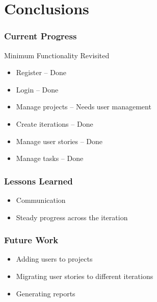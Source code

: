 \documentclass[final]{beamer}
\begin{document}
\section{Conclusions}

\begin{frame}
	\frametitle{Current Progress}
	\begin{beamerboxesrounded}[shadow]{Minimum Functionality Revisited}
		\begin{itemize}
			\item{Register -- Done}
			\item{Login -- Done}
			\item{Manage projects -- Needs user management}
			\item{Create iterations -- Done}
			\item{Manage user stories -- Done}
			\item{Manage tasks -- Done}
		\end{itemize}
	\end{beamerboxesrounded}
\end{frame}

\begin{frame}
	\frametitle{Lessons Learned}
	\begin{beamerboxesrounded}[shadow]{}
		\begin{itemize}
			\item{Communication}
			\item{Steady progress across the iteration}
		\end{itemize}
	\end{beamerboxesrounded}
\end{frame}

\begin{frame}
	\frametitle{Future Work}
	\begin{beamerboxesrounded}[shadow]{}
		\begin{itemize}
			\item{Adding users to projects}
			\item{Migrating user stories to different iterations}
			\item{Generating reports}
		\end{itemize}
	\end{beamerboxesrounded}
\end{frame}
\end{document}
